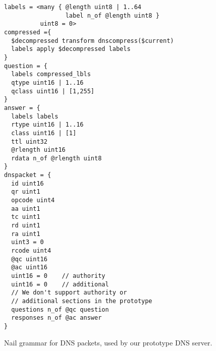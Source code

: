 \begin{figure}
\smaller[0.5]
\begin{verbatim}
labels = <many { @length uint8 | 1..64
                 label n_of @length uint8 }
          uint8 = 0>
compressed ={
  $decompressed transform dnscompress($current)
  labels apply $decompressed labels
}
question = {
  labels compressed_lbls
  qtype uint16 | 1..16
  qclass uint16 | [1,255]
}
answer = {
  labels labels
  rtype uint16 | 1..16
  class uint16 | [1]
  ttl uint32
  @rlength uint16
  rdata n_of @rlength uint8
}
dnspacket = {
  id uint16
  qr uint1
  opcode uint4
  aa uint1
  tc uint1
  rd uint1
  ra uint1
  uint3 = 0
  rcode uint4
  @qc uint16
  @ac uint16
  uint16 = 0    // authority
  uint16 = 0    // additional
  // We don't support authority or
  // additional sections in the prototype
  questions n_of @qc question
  responses n_of @ac answer
}
\end{verbatim}
\caption{Nail grammar for DNS packets, used by our prototype DNS server.}
\label{fig:dns-full}
\end{figure}
